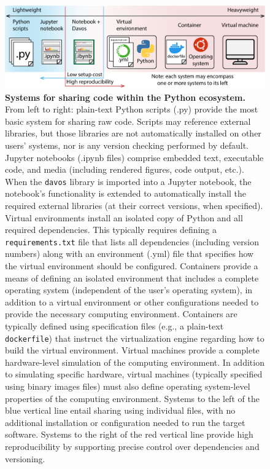 \documentclass[preprint,12pt, a4paper]{elsarticle}
\begin{document}
\begin{figure}[tp]
\centering
\includegraphics[width=\textwidth]{figs/shareable_code}
\caption{\small \textbf{Systems for sharing code within the Python
    ecosystem.}  From left to right: plain-text Python scripts (.py) provide the
  most basic system for sharing raw code.  Scripts may reference
  external libraries, but those libraries are not automatically
  installed on other users' systems, nor is any version checking
  performed by default.  Jupyter notebooks (.ipynb files) comprise embedded text,
  executable code, and media (including rendered figures, code output,
  etc.).  When the \texttt{davos} library is imported into a Jupyter
  notebook, the notebook's functionality is extended to automatically
  install the required external libraries (at their correct versions,
  when specified).  Virtual environments install an isolated copy of
  Python and all required dependencies.  This typically requires
  defining a \texttt{requirements.txt} file that lists all
  dependencies (including version numbers) along with an environment
  (.yml) file that specifies how the virtual environment should be
  configured.  Containers provide a means of defining an isolated
  environment that includes a complete operating system (independent
  of the user's operating system), in addition to a virtual
  environment or other configurations needed to provide the necessary
  computing environment.  Containers are typically defined using
  specification files (e.g., a plain-text \texttt{dockerfile}) that
  instruct the virtualization engine regarding how to build the
  virtual environment.  Virtual machines provide a complete
  hardware-level simulation of the computing environment.  In addition
  to simulating specific hardware, virtual machines (typically
  specified using binary images files) must also define operating
  system-level properties of the computing environment.  Systems to
  the left of the blue vertical line entail sharing using individual
  files, with no additional installation or configuration needed to
  run the target software.  Systems to the right of the red vertical
  line provide high reproducibility by supporting precise control over
  dependencies and versioning.}
\label{fig:code-sharing}
\end{figure}
\end{document}
